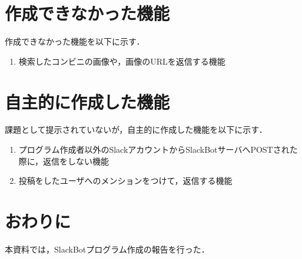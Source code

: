 \documentclass[12pt]{jsarticle}
\begin{document}
\section{作成できなかった機能}
作成できなかった機能を以下に示す．

\begin{enumerate}
  \item 検索したコンビニの画像や，画像のURLを返信する機能
\end{enumerate}

\section{自主的に作成した機能}
課題として提示されていないが，自主的に作成した機能を以下に示す．

\begin{enumerate}
  \item プログラム作成者以外のSlackアカウントからSlackBotサーバへPOSTされた際に，返信をしない機能
  \item 投稿をしたユーザへのメンションをつけて，返信する機能
\end{enumerate}


\section{おわりに}
\label{sec:conclusion}
本資料では，SlackBotプログラム作成の報告を行った．

%
%
\end{document}
